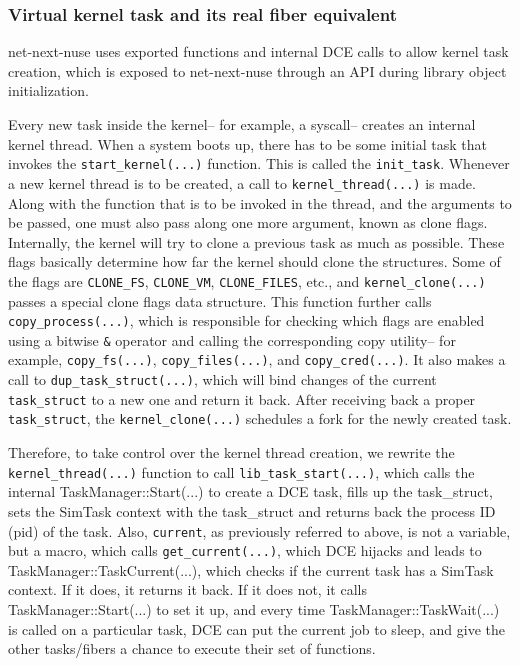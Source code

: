 \documentclass{sig-alternate}
\begin{document}
\subsubsection{Virtual kernel task and its real fiber equivalent}
net-next-nuse uses exported functions and internal DCE calls to allow kernel task creation,  which is exposed to net-next-nuse through an API during library object initialization.

\sloppy Every new task inside the kernel-- for example, a syscall--
creates an internal kernel thread.  When a system boots up, there has to be some initial task that invokes the \texttt{start\_kernel(...)} 
function. This is called the \texttt{init\_task}. Whenever a new kernel thread is to be created, a call to \texttt{kernel\_thread(...)} is made. Along with the 
function that is to be invoked in the thread, and the arguments to be passed, one must also pass along one more argument, known as clone flags. 
Internally, the kernel will try to clone a previous task as much as possible. These flags basically determine 
how far the kernel should clone the structures. Some of the flags are \texttt{CLONE\_FS}, \texttt{CLONE\_VM}, \texttt{CLONE\_FILES}, etc., 
and \texttt{kernel\_clone(...)} passes a special clone flags data structure. This function further calls \texttt{copy\_process(...)}, which is responsible for checking 
which flags are enabled using a bitwise \texttt{\&} operator and calling the corresponding copy utility-- for example, \texttt{copy\_fs(...)}, \texttt{copy\_files(...)}, 
and \texttt{copy\_cred(...)}.  It also makes a call to \texttt{dup\_task\_struct(...)}, which will bind changes of the current \texttt{task\_struct} to a new one and 
return it back. After receiving back a proper \texttt{task\_struct}, the \texttt{kernel\_clone(...)} schedules a fork for the newly created task.

\sloppy Therefore, to take  control over the kernel thread creation, we rewrite the \texttt{kernel\_thread(...)} function to call 
\texttt{lib\_task\_start(...)}, which calls the 
internal TaskManager::Start(...) to create a DCE task, fills up the task\_struct, sets the SimTask context with the task\_struct and returns back 
the process ID (pid) of the task. Also, \texttt{current}, as previously referred to above, is not a variable, but a macro, which calls \texttt{get\_current(...)}, which DCE hijacks and leads to TaskManager::TaskCurrent(...), which checks if the current task has a SimTask context. If it does, it returns it back. 
If it does not, it calls TaskManager::Start(...) to set it up, and every time 
TaskManager::TaskWait(...)  is called on a particular task, DCE can put the current job to sleep, and give the other tasks/fibers a chance to 
execute their set of functions. 
 
\end{document}

